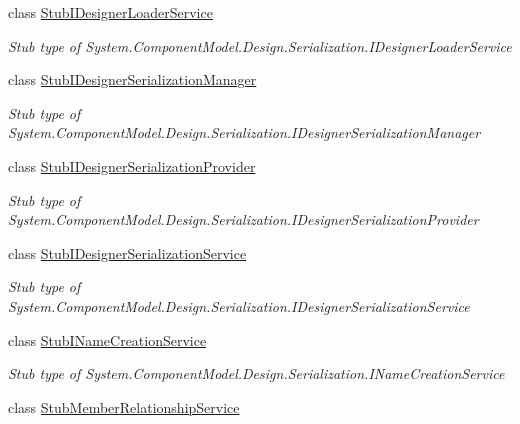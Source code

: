 \begin{DoxyCompactItemize}
class \hyperlink{class_system_1_1_component_model_1_1_design_1_1_serialization_1_1_fakes_1_1_stub_i_designer_loader_service}{Stub\-I\-Designer\-Loader\-Service}
\begin{DoxyCompactList}\small\item\em Stub type of System.\-Component\-Model.\-Design.\-Serialization.\-I\-Designer\-Loader\-Service\end{DoxyCompactList}\item 
class \hyperlink{class_system_1_1_component_model_1_1_design_1_1_serialization_1_1_fakes_1_1_stub_i_designer_serialization_manager}{Stub\-I\-Designer\-Serialization\-Manager}
\begin{DoxyCompactList}\small\item\em Stub type of System.\-Component\-Model.\-Design.\-Serialization.\-I\-Designer\-Serialization\-Manager\end{DoxyCompactList}\item 
class \hyperlink{class_system_1_1_component_model_1_1_design_1_1_serialization_1_1_fakes_1_1_stub_i_designer_serialization_provider}{Stub\-I\-Designer\-Serialization\-Provider}
\begin{DoxyCompactList}\small\item\em Stub type of System.\-Component\-Model.\-Design.\-Serialization.\-I\-Designer\-Serialization\-Provider\end{DoxyCompactList}\item 
class \hyperlink{class_system_1_1_component_model_1_1_design_1_1_serialization_1_1_fakes_1_1_stub_i_designer_serialization_service}{Stub\-I\-Designer\-Serialization\-Service}
\begin{DoxyCompactList}\small\item\em Stub type of System.\-Component\-Model.\-Design.\-Serialization.\-I\-Designer\-Serialization\-Service\end{DoxyCompactList}\item 
class \hyperlink{class_system_1_1_component_model_1_1_design_1_1_serialization_1_1_fakes_1_1_stub_i_name_creation_service}{Stub\-I\-Name\-Creation\-Service}
\begin{DoxyCompactList}\small\item\em Stub type of System.\-Component\-Model.\-Design.\-Serialization.\-I\-Name\-Creation\-Service\end{DoxyCompactList}\item 
class \hyperlink{class_system_1_1_component_model_1_1_design_1_1_serialization_1_1_fakes_1_1_stub_member_relationship_service}{Stub\-Member\-Relationship\-Service}

\end{DoxyCompactItemize}
